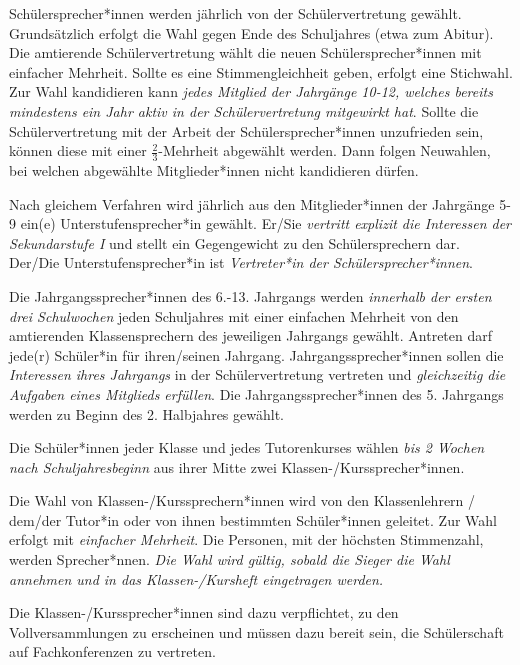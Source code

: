 \documentclass[10pt,a4paper,oneside,parskip=half]{scrartcl}
\begin{document}
\begin{contract}
Schülersprecher*innen werden jährlich von der Schülervertretung gewählt. Grundsätzlich erfolgt die Wahl gegen Ende des Schuljahres (etwa zum Abitur).
Die amtierende Schülervertretung wählt die neuen Schülersprecher*innen mit einfacher Mehrheit. Sollte es eine Stimmengleichheit geben, erfolgt eine Stichwahl. %
Zur Wahl kandidieren kann \emph{jedes Mitglied der Jahrgänge 10-12, welches bereits mindestens ein Jahr aktiv in der Schülervertretung mitgewirkt hat}. Sollte die Schülervertretung mit der Arbeit der Schülersprecher*innen unzufrieden sein, können diese mit einer $\frac{2}{3}$-Mehrheit abgewählt werden. Dann folgen Neuwahlen, bei welchen abgewählte Mitglieder*innen nicht kandidieren dürfen.

Nach gleichem Verfahren wird jährlich aus den Mitglieder*innen der Jahrgänge 5-9 ein(e) Unterstufensprecher*in gewählt. Er/Sie \emph{vertritt explizit die Interessen der Sekundarstufe I} und stellt ein Gegengewicht zu den Schülersprechern dar. Der/Die Unterstufensprecher*in ist \emph{Vertreter*in der Schülersprecher*innen}.

Die Jahrgangssprecher*innen des 6.-13. Jahrgangs werden \emph{innerhalb der ersten drei Schulwochen} jeden Schuljahres mit einer einfachen Mehrheit von den amtierenden Klassensprechern des jeweiligen Jahrgangs gewählt. Antreten darf jede(r) Schüler*in für ihren/seinen Jahrgang. Jahrgangssprecher*innen sollen die \emph{Interessen ihres Jahrgangs} in der Schülervertretung vertreten und \emph{gleichzeitig die Aufgaben eines Mitglieds erfüllen}. Die Jahrgangssprecher*innen des 5. Jahrgangs werden zu Beginn des 2. Halbjahres gewählt.

Die Schüler*innen jeder Klasse und jedes Tutorenkurses wählen \emph{bis 2 Wochen nach Schuljahresbeginn} aus ihrer Mitte zwei Klassen-/Kurssprecher*innen.

Die Wahl von Klassen-/Kurssprechern*innen wird von den Klassenlehrern / dem/der Tutor*in oder von ihnen bestimmten Schüler*innen geleitet.
Zur Wahl erfolgt mit \emph{einfacher Mehrheit}. Die Personen, mit der höchsten Stimmenzahl, werden Sprecher*nnen. %
\emph{Die Wahl wird gültig, sobald die Sieger die Wahl annehmen und in das Klassen-/Kursheft eingetragen werden.}

Die Klassen-/Kurssprecher*innen sind dazu verpflichtet, zu den Vollversammlungen zu erscheinen und müssen dazu bereit sein, die Schülerschaft auf Fachkonferenzen zu vertreten.


\end{contract}
\end{document}
